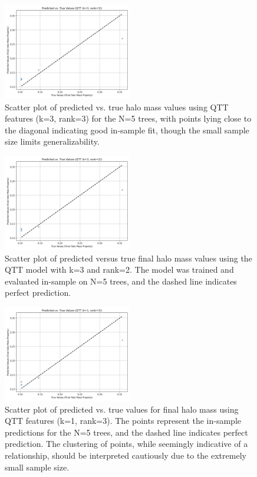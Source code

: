 \documentclass[twocolumn]{aastex631}
\begin{document}
\begin{figure}[h!]
    \centering
    \includegraphics[width=0.5\textwidth]{../input_files/plots/pred_vs_true_qtt_k3_r3_19_20250524-175150.png}
    \caption{Scatter plot of predicted vs. true halo mass values using QTT features (k=3, rank=3) for the N=5 trees, with points lying close to the diagonal indicating good in-sample fit, though the small sample size limits generalizability.
}
    \label{fig:pred_vs_true_qtt}
\end{figure}

\begin{figure}[h!]
    \centering
    \includegraphics[width=0.5\textwidth]{../input_files/plots/pred_vs_true_qtt_k3_r2_16_20250524-175150.png}
    \caption{Scatter plot of predicted versus true final halo mass values using the QTT model with k=3 and rank=2. The model was trained and evaluated in-sample on N=5 trees, and the dashed line indicates perfect prediction.
}
    \label{fig:pred_vs_true_qtt_k3_r2}
\end{figure}

\begin{figure}[h!]
    \centering
    \includegraphics[width=0.5\textwidth]{../input_files/plots/pred_vs_true_qtt_k1_r3_7_20250524-175150.png}
    \caption{Scatter plot of predicted vs. true values for final halo mass using QTT features (k=1, rank=3). The points represent the in-sample predictions for the N=5 trees, and the dashed line indicates perfect prediction. The clustering of points, while seemingly indicative of a relationship, should be interpreted cautiously due to the extremely small sample size.
}
    \label{fig:pred_vs_true_qtt_k1_r3}
\end{figure}
\end{document}
